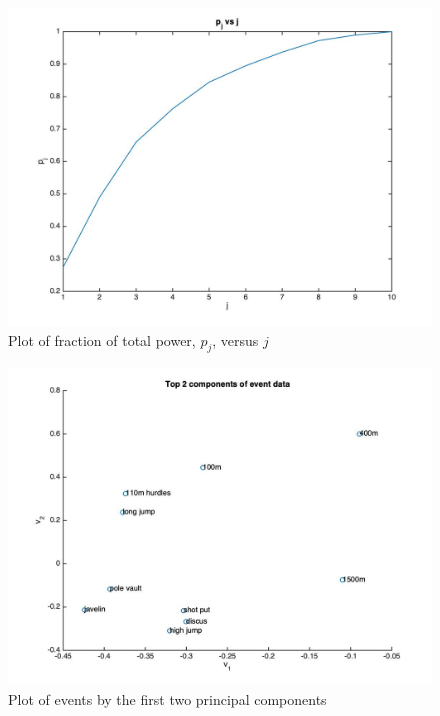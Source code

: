 \documentclass[12pt]{exam}
\begin{document}
\begin{questions}
  \begin{figure}[hpb!]
    \centering
    \includegraphics[scale=0.3]{data/power_vs_j.jpg}{}
    \caption{Plot of fraction of total power, $p_j$, versus $j$}
    \label{fig:p_j_vs_j}
  \end{figure}

  \begin{figure}[hpb!]
    \centering
    \includegraphics[scale=0.3]{data/principal_components.jpg}
    \caption{Plot of events by the first two principal components}
    \label{fig:principal_components}
  \end{figure}


\end{questions}
\end{document}
